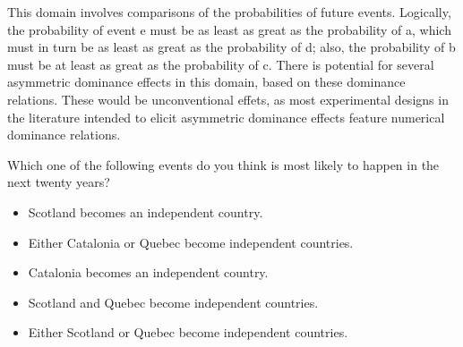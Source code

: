 
This domain involves comparisons of the probabilities of future events.
Logically, the probability of event e must be as least as great as the probability of a, which must in turn be as least as great as the probability of d; also, the probability of b must be at least as great as the probability of c.
There is potential for several asymmetric dominance effects in this domain, based on these dominance relations.
These would be unconventional effets, as most experimental designs in the literature intended to elicit asymmetric dominance effects feature numerical dominance relations.

\begin{tcolorbox}
Which one of the following events do you think is most likely to happen in the next twenty years?

\begin{itemize}
	\setlength\itemsep{-5pt}
	\item Scotland becomes an independent country.
	\item Either Catalonia or Quebec become independent countries.
	\item Catalonia becomes an independent country.
	\item Scotland and Quebec become independent countries.
	\item Either Scotland or Quebec become independent countries.
\end{itemize}
\end{tcolorbox}

